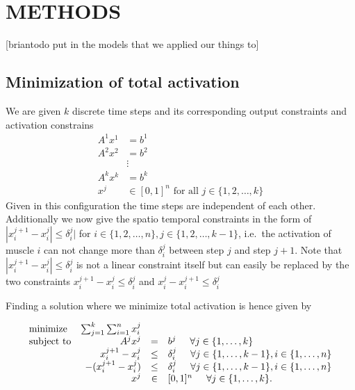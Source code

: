 \section{METHODS}
[briantodo put in the models that we applied our things to]
\subsection{Minimization of total activation}
\label{sub:minimization_of_total_activation} %
We are given $k$ discrete time steps and its corresponding output constraints and activation constrains
\begin{align*}
A^1 x^1 &= b^1 \\
A^2 x^2 &= b^2 \\
 &\vdots \\
A^k x^k &= b^k \\
x^j &\in [0,1]^n \text{ for all } j \in \{1,2,\dots,k\} 
\end{align*}
Given in this configuration the time steps are independent of each other. Additionally we now give the spatio temporal constraints in the form of $|x_i^{j+1} - x_i^{j}| \leq \delta_i^j|$ for $i \in \{1,2,\dots,n\}, j \in \{1,2,\dots,k-1\}$, i.e.\ the activation of muscle $i$ can not change more than $\delta_i^j$ between step $j$ and step $j+1$. Note that $|x_i^{j+1} - x_i^{j}| \leq \delta_i^j$ is not a linear constraint itself but can easily be replaced by the two constraints $x_i^{j+1} - x_i^{j} \leq \delta_i^j$ and $x_i^{j} - x_i^{j+1} \leq \delta_i^j$

Finding a solution where we minimize total activation is hence given by

\begin{equation}
\begin{array}{lrcl}
\mbox{minimize} & \sum_{j=1}^k \sum_{i=1}^n x_i^j \\ 
\mbox{subject to} & A^j x^j &=& b^j \hspace{5mm} \forall j \in \{1,\dots, k\} \\
  & x_i^{j+1} - x_i^{j} &\leq& \delta_i^j  \hspace{5mm} \forall j \in \{1,\dots, k-1\}, i \in \{1,\dots,n\} \\
  &  -(x_i^{j+1} - x_i^{j}) &\leq& \delta_i^j  \hspace{5mm} \forall j \in \{1,\dots, k-1\}, i \in \{1,\dots,n\} \\
  & x^j &\in& [0,1]^n \hspace{5mm} \forall j \in \{1,\dots, k\}.
\end{array}
\end{equation}

